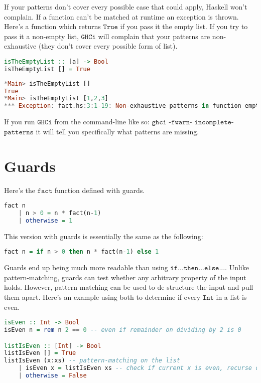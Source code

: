 \documentclass[a4paper,12pt]{article}
\newcommand{\keywadj}[1]{\mathtt{#1}}
\begin{document}
\noindent
If your patterns don't cover every possible case that could apply, Haskell won't complain. If a function can't be matched at runtime an exception is thrown. Here's a function which returns $\keywadj{True}$ if you pass it the empty list. If you try to pass it a non-empty list, $\keywadj{GHCi}$ will complain that your patterns are non-exhaustive (they don't cover every possible form of list).

\begin{lstlisting}[language=Haskell]
isTheEmptyList :: [a] -> Bool
isTheEmptyList [] = True
\end{lstlisting}

\begin{lstlisting}[language=Haskell]
*Main> isTheEmptyList []
True
*Main> isTheEmptyList [1,2,3]
*** Exception: fact.hs:3:1-19: Non-exhaustive patterns in function emptyList
\end{lstlisting}

\noindent
If you run $\keywadj{GHCi}$ from the command-line like so: $\keywadj{ghci}$ -$\keywadj{fwarn}$- $\keywadj{incomplete}$-$\keywadj{patterns}$ it will tell you specifically what patterns are missing.

\section{Guards}

\noindent
Here's the $\keywadj{fact}$ function defined with guards.

\begin{lstlisting}[language=Haskell]
fact n
	| n > 0 = n * fact(n-1)
	| otherwise = 1
\end{lstlisting}

\noindent
This version with guards is essentially the same as the following:

\begin{lstlisting}[language=Haskell]
fact n = if n > 0 then n * fact(n-1) else 1
\end{lstlisting}

\noindent
Guards end up being much more readable than using $\keywadj{ if ... then ... else ...}$. Unlike pattern-matching, guards can test whether any arbitrary property of the input holds. However, pattern-matching can be used to de-structure the input and pull them apart. Here's an example using both to determine if every $\keywadj{Int}$ in a list is even.

\begin{lstlisting}[language=Haskell]
isEven :: Int -> Bool
isEven n = rem n 2 == 0 -- even if remainder on dividing by 2 is 0

listIsEven :: [Int] -> Bool
listIsEven [] = True
listIsEven (x:xs) -- pattern-matching on the list
	| isEven x = listIsEven xs -- check if current x is even, recurse on rest of the list
	| otherwise = False
\end{lstlisting}
\end{document}
